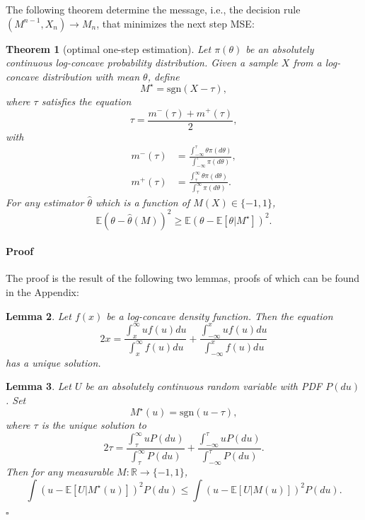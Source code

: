 \documentclass[letterpaper, 11pt]{IEEEtran}      %
\newtheorem{thm}{\bf{Theorem}}
\newtheorem{lem}[thm]{\bf {Lemma}}
\newenvironment{proof}{\paragraph*{Proof}}{\hfill$\square$ \newline}
\newcommand{\sgn}{\mathrm{sgn} }
\begin{document}
The following theorem determine the message, i.e., the decision rule $(M^{n-1},X_n)\rightarrow M_n$, that minimizes the next step MSE:
\begin{thm}[optimal one-step estimation] \label{thm:opt_one_step}
Let $\pi(\theta)$ be an absolutely continuous log-concave probability distribution. Given a sample $X$ from a log-concave distribution with mean $\theta$, define 
\begin{equation}
\label{eq:adaptive_main_message}
M^\star = \sgn(X - \tau),
\end{equation}
where $\tau$ satisfies the equation
\begin{equation}
 \label{eq:fixed_point}
 \tau = \frac{m^-(\tau) + m^+(\tau)}{2},
\end{equation}
with
\begin{align*}
m^-(\tau)  & = \frac{\int_{-\infty}^{\tau} \theta \pi(d\theta) }{\int_{-\infty}^{\tau} \pi(d\theta)} ,\\
m^+(\tau) & = \frac{\int_{\tau}^\infty \theta \pi(d\theta) }{\int_{\tau}^\infty \pi(d\theta)} .
\end{align*}
For any estimator $\hat{\theta}$ which is a function of $M(X) \in \{-1,1\}$,
\begin{equation}
\label{eq:opt_cond}
\mathbb E \left(\theta-\hat{\theta}(M)\right)^2 \geq  \mathbb E \left(\theta- \mathbb E[\theta|M^\star]\right)^2.
\end{equation}
\end{thm}

\begin{proof}
The proof is the result of the following two lemmas, proofs of which can be found in the Appendix:
\begin{lem} \label{lem:unique}
Let $f(x)$ be a log-concave density function. Then the equation 
\begin{equation}
\label{eq:lem_fixed_point}
2x = \frac{\int_x^\infty uf(u)du}{\int_x^\infty f(u)du} + \frac{\int_{-\infty}^x uf(u)du}{\int_{-\infty}^x f(u)du} 
\end{equation}
has a unique solution.
\end{lem}
\begin{lem} \label{lem:adaptive}
Let $U$ be an absolutely continuous random variable with PDF $P(du)$. Set 
\[
M^\star(u)  =  \sgn(u - \tau),
\]
where $\tau$ is the unique solution to
 \[
2 \tau = \frac{\int_{\tau}^\infty u P(du)} {\int_{\tau}^\infty P(du)} + \frac{\int_{-\infty}^{\tau} u P(du)}{\int_{-\infty}^{\tau} P(du)}.
\]
Then for any measurable $M: \mathbb R\to \{-1,1\}$,
\[
\int \left( u - \mathbb E[U|M^\star (u)]  \right)^2 P(du) \leq \int \left( u - \mathbb E[U|M(u)]  \right)^2 P(du). 
\]
\end{lem}
\end{proof}
\end{document}
